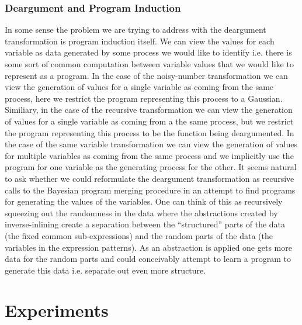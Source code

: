 \documentclass[a4paper,10pt]{article}
\begin{document}
\subsubsection{Deargument and Program Induction}
In some sense the problem we are trying to address with the deargument transformation is program induction itself.  We can view the values for each variable as data generated by some process we would like to identify i.e. there is some sort of common computation between variable values that we would like to represent as a program.  In the case of the noisy-number transformation we can view the generation of values for a single variable as coming from the same process, here we restrict the program representing this process to a Gaussian.  Similiary, in the case of the recursive transformation we can view the generation of values for a single variable as coming from a the same process, but we restrict the program representing this process to be the function being deargumented.  In the case of the same variable transformation we can view the generation of values for multiple variables as coming from the same process and we implicitly use the program for one variable as the generating process for the other.  It seems natural to ask whether we could reformulate the deargument transformation as recursive calls to the Bayesian program merging procedure in an attempt to find programs for generating the values of the variables.  One can think of this as recursively squeezing out the randomness in the data where the abstractions created by inverse-inlining create a separation between the ``structured'' parts of the data (the fixed common sub-expressions) and the random parts of the data (the variables in the expression patterns).  As an abstraction is applied one gets more data for the random parts and could conceivably attempt to learn a program to generate this data i.e. separate out even more structure.
\section{Experiments}
\end{document}
